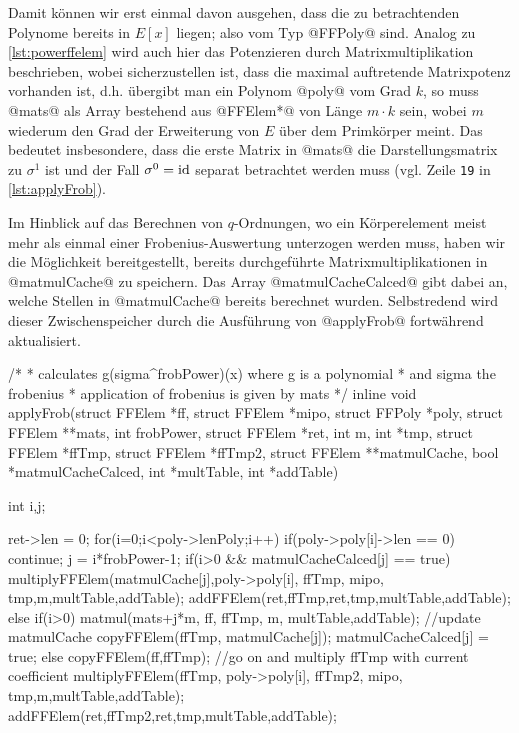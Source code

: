 Damit können wir erst einmal davon ausgehen, dass die zu betrachtenden Polynome
bereits in $E[x]$ liegen; also vom Typ @FFPoly@ sind. Analog zu 
\autoref{lst:powerffelem} wird auch hier das Potenzieren durch
Matrixmultiplikation beschrieben, wobei sicherzustellen ist, dass die maximal
auftretende Matrixpotenz vorhanden ist, d.h. übergibt man ein Polynom @poly@
vom Grad $k$, so muss @mats@ als Array bestehend aus @FFElem*@ von Länge
$m\cdot k$ sein, wobei $m$ wiederum den Grad der Erweiterung von $E$ über dem
Primkörper meint. Das bedeutet insbesondere, dass die erste Matrix in @mats@
die Darstellungsmatrix zu $\sigma^1$ ist und der Fall $\sigma^0 = \operatorname{id}$ separat
betrachtet werden muss (vgl. Zeile \texttt{19} in \autoref{lst:applyFrob}).

Im Hinblick auf das Berechnen von $q$-Ordnungen, wo ein Körperelement meist
mehr als einmal einer Frobenius-Auswertung unterzogen werden muss, haben wir
die Möglichkeit bereitgestellt, bereits durchgeführte Matrixmultiplikationen in
@matmulCache@ zu speichern. Das Array @matmulCacheCalced@ gibt dabei an, welche
Stellen in @matmulCache@ bereits berechnet wurden. Selbstredend wird dieser 
Zwischenspeicher durch die Ausführung von @applyFrob@ fortwährend aktualisiert.

\begin{ccode}[caption={Aus \url{../Sage/enumeratePCNs.c}},
  label=lst:applyFrob]
/*
 * calculates g(sigma^frobPower)(x) where g is a polynomial 
 * and sigma the frobenius
 * application of frobenius is given by mats
 */
inline void applyFrob(struct FFElem *ff, struct FFElem *mipo,
        struct FFPoly *poly,
        struct FFElem **mats,
        int frobPower, struct FFElem *ret, 
        int m, int *tmp, struct FFElem *ffTmp, struct FFElem *ffTmp2,
        struct FFElem **matmulCache, bool *matmulCacheCalced,
        int *multTable, int *addTable){
    int i,j;
        
    ret->len = 0;
    for(i=0;i<poly->lenPoly;i++){
        if(poly->poly[i]->len == 0) continue;
        j = i*frobPower-1;
        if(i>0 && matmulCacheCalced[j] == true){
            multiplyFFElem(matmulCache[j],poly->poly[i],
                    ffTmp, mipo,
                    tmp,m,multTable,addTable);
            addFFElem(ret,ffTmp,ret,tmp,multTable,addTable);
        }else{
            if(i>0){
                matmul(mats+j*m, ff, ffTmp, m, multTable,addTable);
                //update matmulCache
                copyFFElem(ffTmp, matmulCache[j]);
                matmulCacheCalced[j] = true;
            }else{
                copyFFElem(ff,ffTmp);
            }
            //go on and multiply ffTmp with current coefficient
            multiplyFFElem(ffTmp, poly->poly[i],
                    ffTmp2, mipo,
                    tmp,m,multTable,addTable);
            addFFElem(ret,ffTmp2,ret,tmp,multTable,addTable);
        }
    }
}
\end{ccode}

